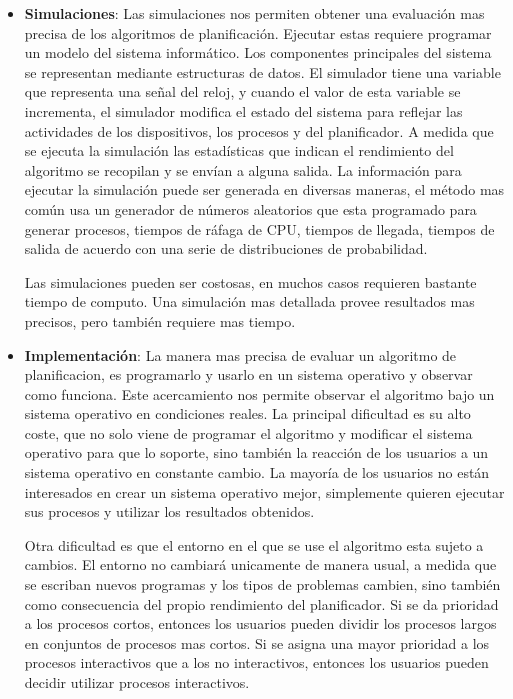 \documentclass{article}
\begin{document}
\begin{itemize}
	\item \textbf{Simulaciones}: Las simulaciones nos permiten obtener una evaluación mas precisa de los algoritmos
	de planificación. Ejecutar estas requiere programar un modelo del sistema informático. Los componentes
	principales del sistema se representan mediante estructuras de datos. El simulador tiene una variable que representa
	una señal del reloj, y cuando el valor de esta variable se incrementa, el simulador modifica el estado del sistema
	para reflejar las actividades de los dispositivos, los procesos y del planificador. A medida que se ejecuta
	la simulación las estadísticas que indican el rendimiento del algoritmo se recopilan y se envían a alguna salida.
	La información para ejecutar la simulación puede ser generada en diversas maneras, el método mas común usa un generador
	de números aleatorios que esta programado para generar procesos, tiempos de ráfaga de CPU, tiempos de llegada, tiempos de
	salida de acuerdo con una serie de distribuciones de probabilidad.
	
	Las simulaciones pueden ser costosas, en muchos casos requieren bastante tiempo de computo.
	Una simulación mas detallada provee resultados mas precisos, pero también requiere mas tiempo.
	\vspace{0.08cm}
	
	\item \textbf{Implementación}: La manera mas precisa de evaluar un algoritmo de planificacion, es programarlo
	y usarlo en un sistema operativo y observar como funciona. Este acercamiento nos permite observar
	el algoritmo bajo un sistema operativo en condiciones reales. La principal dificultad es su alto coste, que no solo viene
	de programar el algoritmo y modificar el sistema operativo para que lo soporte, sino también la reacción de los
	usuarios a un sistema operativo en constante cambio. La mayoría de los usuarios no están interesados en crear
	un sistema operativo mejor, simplemente quieren ejecutar sus procesos y utilizar los resultados obtenidos.
	
	Otra dificultad es que el entorno en el que se use el algoritmo esta sujeto a cambios. El entorno no cambiará
	unicamente de manera usual, a medida que se escriban nuevos programas y los tipos de problemas cambien, sino también
	como consecuencia del propio rendimiento del planificador.
	Si se da prioridad a los procesos cortos, entonces los usuarios pueden dividir los procesos largos en
	conjuntos de procesos mas cortos. Si se asigna una mayor prioridad a los procesos interactivos que a los no
	interactivos, entonces los usuarios pueden decidir utilizar procesos interactivos.
\end{itemize}
\end{document}
